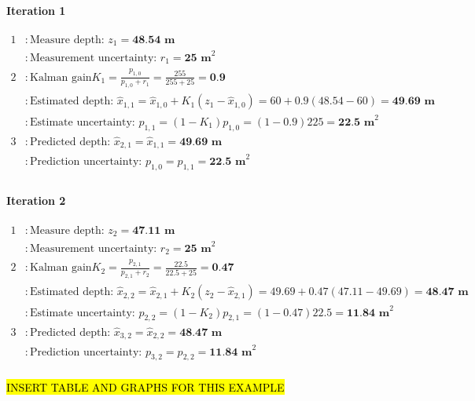 \begin{example}
            \paragraph*{Iteration 1}
            \begin{equation*}
                \begin{aligned}
                    1 &: \text{Measure depth: } z_1 = \textbf{48.54 m} \\
                      &: \text{Measurement uncertainty: } r_1 = \textbf{25 m}^2 \\
                    2 &: \text{Kalman gain} K_1 = \frac{p_{1,0}}{p_{1,0}+r_1} = \frac{255}{255 + 25} = \textbf{0.9} \\
                      &: \text{Estimated depth: } \hat{x}_{1,1} = \hat{x}_{1,0} + K_1(z_1 - \hat{x}_{1,0}) = 60 + 0.9(48.54-60) = \textbf{49.69 m} \\
                      &: \text{Estimate uncertainty: } p_{1,1} = (1-K_1)p_{1,0} = (1-0.9)225 = \textbf{22.5 m}^2 \\
                    3 &: \text{Predicted depth: } \hat{x}_{2,1} = \hat{x}_{1,1} = \textbf{49.69 m} \\
                      &: \text{Prediction uncertainty: } p_{1,0} = p_{1,1} = \textbf{22.5 m}^2 \\
                \end{aligned}
            \end{equation*}

            \paragraph*{Iteration 2}
            \begin{equation*}
                \begin{aligned}
                    1 &: \text{Measure depth: } z_2 = \textbf{47.11 m} \\
                      &: \text{Measurement uncertainty: } r_2 = \textbf{25 m}^2 \\
                    2 &: \text{Kalman gain} K_2 = \frac{p_{2,1}}{p_{2,1}+r_2} = \frac{22.5}{22.5 + 25} = \textbf{0.47} \\
                      &: \text{Estimated depth: } \hat{x}_{2,2} = \hat{x}_{2,1} + K_2(z_2 - \hat{x}_{2,1}) = 49.69 + 0.47(47.11-49.69) = \textbf{48.47 m} \\
                      &: \text{Estimate uncertainty: } p_{2,2} = (1-K_2)p_{2,1} = (1-0.47)22.5 = \textbf{11.84 m}^2 \\
                    3 &: \text{Predicted depth: } \hat{x}_{3,2} = \hat{x}_{2,2} = \textbf{48.47 m} \\
                      &: \text{Prediction uncertainty: } p_{3,2} = p_{2,2} = \textbf{11.84 m}^2 \\
                \end{aligned}
            \end{equation*}

            \hl{INSERT TABLE AND GRAPHS FOR THIS EXAMPLE}

        \end{example}

